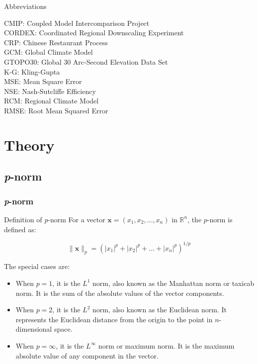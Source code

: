 \documentclass[xcolor={dvipsnames}]{beamer}
\begin{document}
\begin{frame}{Abbreviations}

CMIP: Coupled Model Intercomparison Project\\
CORDEX: Coordinated Regional Downscaling Experiment\\
CRP: Chinese Restaurant Process \\
GCM: Global Climate Model\\
GTOPO30: Global 30 Arc-Second Elevation Data Set\\
K-G: Kling-Gupta\\
MSE: Mean Square Error\\
NSE: Nash-Sutcliffe Efficiency\\
RCM: Regional Climate Model\\
RMSE: Root Mean Squared Error


\end{frame}

\section{Theory}

\subsection{\textit{p}-norm}

\begin{frame}
\frametitle{\textit{p}-norm}

\begin{alertblock}{Definition of \textit{p}-norm}
For a vector \( \mathbf{x} = (x_1, x_2, \ldots, x_n) \) in \( \mathbb{R}^n \), the \( p \)-norm is defined as:

\[ \| \mathbf{x} \|_p = \left( |x_1|^p + |x_2|^p + \ldots + |x_n|^p \right)^{1/p} \]
\end{alertblock}



The special cases are:

\begin{itemize}
\item<1-> When \( p = 1 \), it is the \( L^1 \) norm, also known as the Manhattan norm or taxicab norm. It is the sum of the absolute values of the vector components.

\item<2-> When \( p = 2 \), it is the \( L^2 \) norm, also known as the Euclidean norm. It represents the Euclidean distance from the origin to the point in \( n \)-dimensional space.

\item<3-> When \( p = \infty \), it is the \( L^\infty \) norm or maximum norm. It is the maximum absolute value of any component in the vector.
\end{itemize}

\end{frame}
\end{document}
